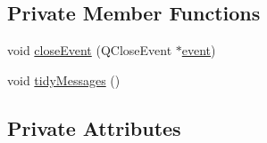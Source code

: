 \subsection*{Private Member Functions}
\begin{DoxyCompactItemize}
\item 
void \hyperlink{class_window_a45ee5a1dc49aa1847cc190fa99f618ae}{close\+Event} (Q\+Close\+Event $\ast$\hyperlink{class_window_a0af393c895469fe202200eefb7e43e5e}{event})
\item 
void \hyperlink{class_window_aa83b20409c3671cfc97c75a697565140}{tidy\+Messages} ()
\end{DoxyCompactItemize}
\subsection*{Private Attributes}
